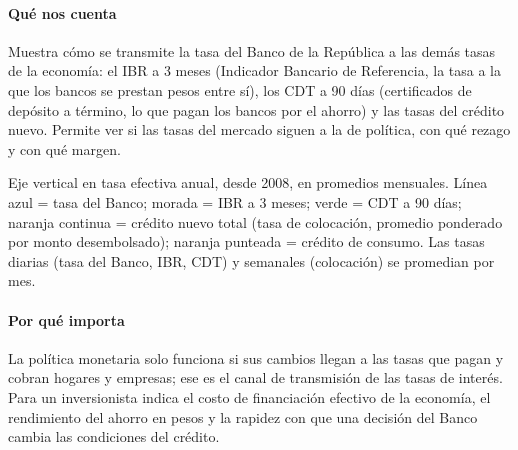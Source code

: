 \paragraph{Qué nos cuenta}
Muestra cómo se transmite la tasa del Banco de la República a las demás tasas de la economía: el IBR a 3 meses (Indicador Bancario de Referencia, la tasa a la que los bancos se prestan pesos entre sí), los CDT a 90 días (certificados de depósito a término, lo que pagan los bancos por el ahorro) y las tasas del crédito nuevo. Permite ver si las tasas del mercado siguen a la de política, con qué rezago y con qué margen.

\begin{leer}
Eje vertical en tasa efectiva anual, desde 2008, en promedios mensuales. Línea azul = tasa del Banco; morada = IBR a 3 meses; verde = CDT a 90 días; naranja continua = crédito nuevo total (tasa de colocación, promedio ponderado por monto desembolsado); naranja punteada = crédito de consumo. Las tasas diarias (tasa del Banco, IBR, CDT) y semanales (colocación) se promedian por mes.
\end{leer}

\paragraph{Por qué importa}
La política monetaria solo funciona si sus cambios llegan a las tasas que pagan y cobran hogares y empresas; ese es el canal de transmisión de las tasas de interés. Para un inversionista indica el costo de financiación efectivo de la economía, el rendimiento del ahorro en pesos y la rapidez con que una decisión del Banco cambia las condiciones del crédito.

